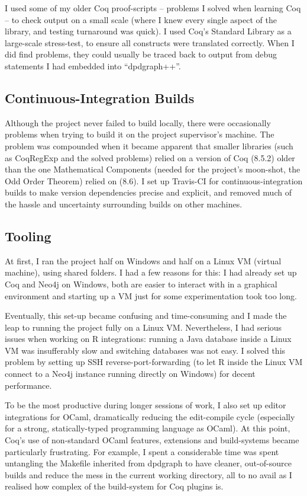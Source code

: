I used some of my older Coq proof-scripts -- problems I solved when learning
Coq -- to check output on a small scale (where I knew every single aspect of the
library, and testing turnaround was quick). I used Coq's Standard Library as a
large-scale stress-test, to ensure all constructs were translated correctly.
When I did find problems, they could usually be traced back to output from debug
statements I had embedded into ``dpdgraph++''.

\subsection{Continuous-Integration Builds}

Although the project never failed to build locally, there were occasionally
problems when trying to build it on the project supervisor's machine. The
problem was compounded when it became apparent that smaller libraries (such as
CoqRegExp and the solved problems) relied on a version of Coq (8.5.2) older than
the one Mathematical Components (needed for the project's moon-shot, the Odd
Order Theorem) relied on (8.6). I set up Travis-CI for continuous-integration
builds to make version dependencies precise and explicit, and removed much of
the hassle and uncertainty surrounding builds on other machines.

\subsection{Tooling}

At first, I ran the project half on Windows and half on a Linux VM (virtual
machine), using shared folders. I had a few reasons for this: I had already set
up Coq and Neo4j on Windows, both are easier to interact with in a graphical
environment and starting up a VM just for some experimentation took too long.

Eventually, this set-up became confusing and time-consuming and I made the leap
to running the project fully on a Linux VM. Nevertheless, I had serious issues
when working on R integrations: running a Java database inside a Linux VM was
insufferably slow and switching databases was not easy. I solved this problem by
setting up SSH reverse-port-forwarding (to let R inside the Linux VM connect to
a Neo4j instance running directly on Windows) for decent performance.

To be the most productive during longer sessions of work, I also set up editor
integrations for OCaml, dramatically reducing the edit-compile cycle (especially
for a strong, statically-typed programming language as OCaml). At this point,
Coq's use of non-standard OCaml features, extensions and build-systems became
particularly frustrating. For example, I spent a considerable time was spent
untangling the Makefile inherited from dpdgraph to have cleaner, out-of-source
builds and reduce the mess in the current working directory, all to no avail as
I realised how complex of the build-system for Coq plugins is.

